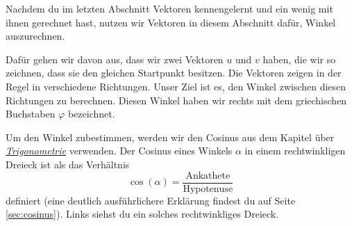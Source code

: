 \documentclass[../../main.tex]{subfiles}
\begin{document}
Nachdem du im letzten Abschnitt Vektoren kennengelernt und ein wenig mit ihnen gerechnet hast, nutzen wir Vektoren in 
diesem Abschnitt dafür, Winkel auszurechnen. 

Dafür gehen wir davon aus, dass wir zwei Vektoren $u$ und $v$ haben, die wir so zeichnen, dass sie den gleichen Startpunkt besitzen.
Die Vektoren zeigen in der Regel in verschiedene Richtungen. Unser Ziel ist es, den Winkel zwischen diesen Richtungen zu
berechnen. Diesen Winkel haben wir rechts mit dem griechischen Buchstaben $\varphi$ bezeichnet.

Um den Winkel zubestimmen, werden wir den Cosinus aus dem Kapitel über \hyperlink{chap:trigonometrie}{\emph{Trigonometrie}} 
verwenden. Der Cosinus eines Winkels $\alpha$ in einem rechtwinkligen Dreieck ist als das Verhältnis
\[\cos(\alpha)=\frac{\text{Ankathete}}{\text{Hypotenuse}}\]
definiert (eine deutlich ausführlichere Erklärung findest du auf Seite \ref{sec:cosinus}). Links siehst du ein solches
rechtwinkliges Dreieck.
\end{document}
